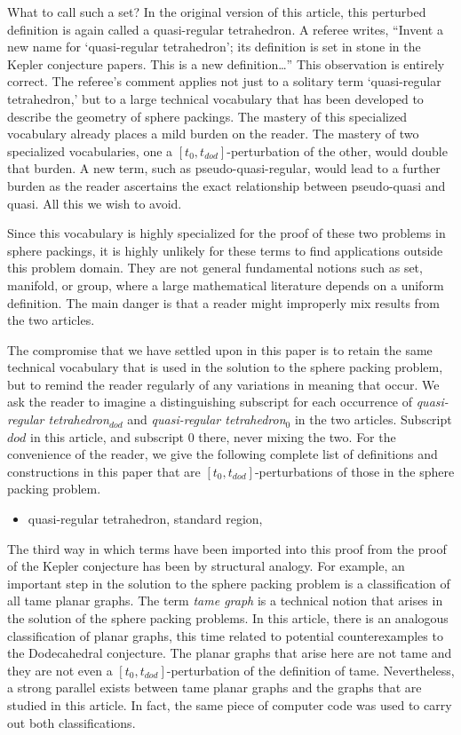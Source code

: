 What to call such a set?  In the original version of this article,
this perturbed definition is again called a quasi-regular tetrahedron. 
A referee writes, ``Invent a new name
for `quasi-regular tetrahedron'; its definition is set in stone
in the Kepler conjecture papers.  This is a new definition\ldots'' 
This observation is entirely correct.  The referee's comment applies not
just to a solitary term `quasi-regular tetrahedron,' but to
a large technical vocabulary that has been developed to describe
the geometry of sphere packings.  The mastery of this specialized
vocabulary already places a mild burden on the reader.  The mastery
of two specialized vocabularies, one a $[t_0,t_{dod}]$-perturbation
of the other, would double that burden.  A new term,
such as pseudo-quasi-regular, would lead to a further burden
as the reader ascertains the exact relationship between
pseudo-quasi and quasi.  All this we wish to avoid.

Since this vocabulary is highly specialized for the proof of these
two problems in sphere packings, it is highly unlikely for these terms to find applications outside this problem domain.  They are not 
general fundamental notions such as set, manifold, or group, where
a large mathematical literature depends on a uniform definition.
The main danger is that a reader might improperly mix results from the
two articles.


The compromise that we have settled upon in this paper is to
retain the same technical vocabulary that is used in the solution
to the sphere packing problem, but to remind the reader regularly
of any variations in meaning that occur.  We ask the reader to
imagine a distinguishing subscript for each occurrence of {\it quasi-regular tetrahedron$_{dod}$}
and 
{\it quasi-regular tetrahedron$_0$} in the two articles.  
Subscript $dod$ in this article, 
and subscript $0$
there, never mixing the two.
For the convenience
of the reader, we give the following complete 
list of definitions and constructions in this
paper that are $[t_0,t_{dod}]$-perturbations of those in the sphere
packing problem.

\begin{itemize}
\item quasi-regular tetrahedron, standard region, 
\end{itemize}

The third way in which terms have been imported into this proof
from the proof of the Kepler conjecture has been by structural
analogy.  For example, an important step in the solution to the
sphere packing problem is a classification of all tame planar graphs.
The term {\it tame graph} is a technical notion that arises in
the solution of the sphere packing problems.  In this article,
there is an analogous classification of planar graphs, this time
related to potential counterexamples to the Dodecahedral conjecture.
The planar graphs that arise here are not tame and they are
not even a $[t_0,t_{dod}]$-perturbation of the definition of tame.  
Nevertheless, a strong parallel exists between tame planar graphs 
and the graphs that are studied in this article.  
In fact, the same piece of computer
code was used to carry out both classifications. 

